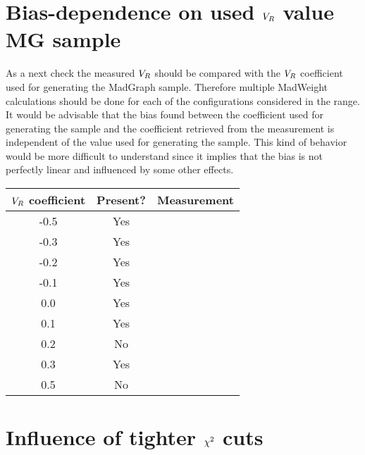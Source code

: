 \newpage
\section{Bias-dependence on used $V_{R}$ value MG sample}

As a next check the measured $V_{R}$ should be compared with the $V_{R}$ coefficient used for generating the MadGraph sample. Therefore multiple MadWeight calculations should be done for each of the configurations considered in the range. It would be advisable that the bias found between the coefficient used for generating the sample and the coefficient retrieved from the measurement is independent of the value used for generating the sample. This kind of behavior would be more difficult to understand since it implies that the bias is not perfectly linear and influenced by some other effects.

\begin{table}[h!t]
 \centering
 \begin{tabular}{c|c|c}
  $V_{R}$ coefficient 	& Present? 	& Measurement 	\\
  \hline
  -0.5 			& Yes 		& 		\\
  -0.3 			& Yes 		& 		\\
  -0.2 			& Yes 		& 		\\
  -0.1 			& Yes 		& 		\\
  0.0 			& Yes 		& 		\\
  0.1 			& Yes 		& 		\\
  0.2 			& No 		& 		\\
  0.3 			& Yes 		& 		\\
  0.5 			& No 		& 		\\
 \end{tabular}
\end{table}

\section{Influence of tighter $\chi^{2}$ cuts}






